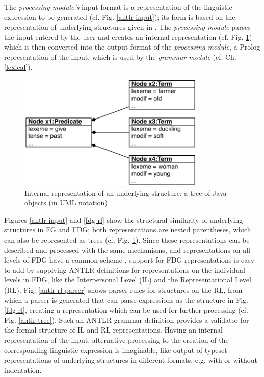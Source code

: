 \documentclass[a4paper, halfparskip, onecolumn, abstractoff, final]{scrartcl}
\begin{document}
The \emph{processing module's} input format is a representation of the linguistic expression to be generated (cf. Fig. \ref{antlr-input}); its form is based on the representation of underlying structures given in \cite{Dik1997a}. The \emph{processing module} parses the input entered by the user and creates an internal representation (cf. Fig. \ref{uml-tree}) which is then converted into the output format of the \emph{processing module}, a Prolog representation of the input, which is used by the \emph{grammar module} (cf. Ch. \ref{lexical}).

\begin{figure}
\begin{center}
\mbox{\includegraphics[height=5.5cm]{objects.pdf}}
\caption{Internal representation of an underlying structure: a tree of Java objects (in UML notation)}
\label{uml-tree}
\end{center}
\end{figure}
    
Figures \ref{antlr-input} and \ref{fdg-rl} show the structural similarity of underlying structures in FG and FDG; both representations are nested parentheses, which can also be represented as trees (cf. Fig. \ref{uml-tree}). Since these representations can be described and processed with the same mechanisms, and representations on all levels of FDG have a common scheme \citep[671]{HengeveldAndMackenzie2006}, support for FDG representations is easy to add by supplying ANTLR definitions for representations on the individual levels in FDG, like the Interpersonal Level (IL) and the Representational Level (RL). Fig. \ref{antlr-rl-parser} shows parser rules for structures on the RL, from which a parser is generated that can parse expressions as the structure in Fig. \ref{fdg-rl}, creating a representation which can be used for further processing (cf. Fig. \ref{antlr-tree}). Such an ANTLR grammar definition provides a validator for the formal structure of IL and RL representations. Having an internal representation of the input, alternative processing to the creation of the corresponding linguistic expression is imaginable, like output of typeset representations of underlying structures in different formats, e.g. with or without indentation.
\end{document}
